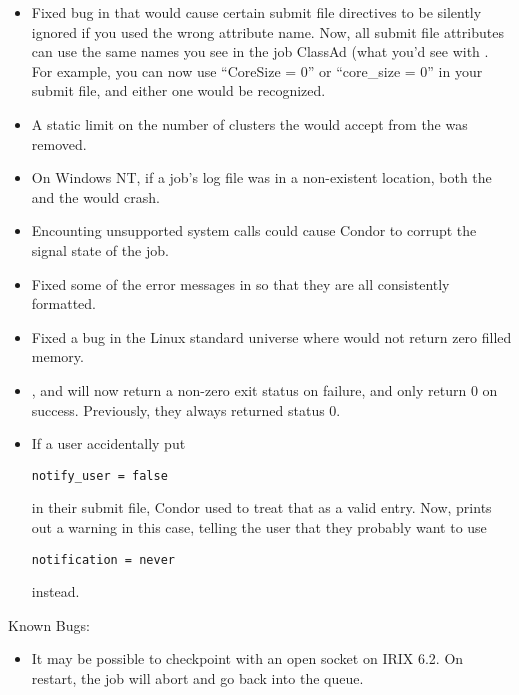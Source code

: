 \begin{itemize}
\item Fixed bug in  that would cause certain submit
file directives to be silently ignored if you used the wrong attribute
name.  
Now, all submit file attributes can use the same names you see in the
job ClassAd (what you'd see with  .
For example, you can now use ``CoreSize = 0''  or ``core\_size = 0''
in your submit file, and either one would be recognized.

\item A static limit on the number of clusters the 
would accept from the  was removed.

\item On Windows NT, if a job's log file was in a non-existent location,
both the  and the  would crash.

\item Encounting unsupported system calls could cause Condor to corrupt the
signal state of the job. 

\item Fixed some of the error messages in  so that they
are all consistently formatted.

\item Fixed a bug in the Linux standard universe where 
would not return zero filled memory.

\item {},  and  will now return
a non-zero exit status on failure, and only return 0 on success.
Previously, they always returned status 0.

\item If a user accidentally put \begin{verbatim}notify_user = false\end{verbatim} in their submit file, Condor used to treat that
as a valid entry.
Now,  prints out a warning in this case, telling the
user that they probably want to use 
\begin{verbatim}notification = never\end{verbatim} instead.

\end{itemize}

\noindent Known Bugs:

\begin{itemize}

\item It may be possible to checkpoint with an open socket on IRIX 6.2.
On restart, the job will abort and go back into the queue. 

\end{itemize}

